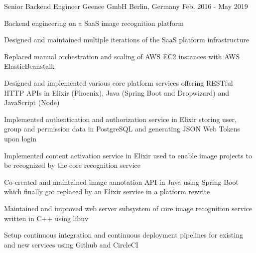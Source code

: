\begin{cventries}
  \cventry
    {Senior Backend Engineer} %
    {Geenee GmbH} %
    {Berlin, Germany} %
    {Feb. 2016 - May 2019} %
    {
      \begin{cvitems} %
        \item {Backend engineering on a SaaS image recognition platform}
        \begin{cvsubitems}
          \item {Designed and maintained multiple iterations of the SaaS platform infrastructure}
          \item {Replaced manual orchestration and scaling of AWS EC2 instances with AWS ElasticBeanstalk}
        \end{cvsubitems}
        \item {Designed and implemented various core platform services offering RESTful HTTP APIs in Elixir (Phoenix), Java (Spring Boot and Dropwizard) and JavaScript (Node)}
        \begin{cvsubitems}
          \item {Implemented authentication and authorization service in Elixir storing user, group and permission data in PostgreSQL and generating JSON Web Tokens upon login}
          \item {Implemented content activation service in Elixir used to enable image projects to be recognized by the core recognition service}
          \item {Co-created and maintained image annotation API in Java using Spring Boot which finally got replaced by an Elixir service in a platform rewrite}
        \end{cvsubitems}
        \item {Maintained and improved web server subsystem of core image recognition service written in C++ using libuv}
        \item {Setup continuous integration and continuous deployment pipelines for existing and new services using Github and CircleCI}
      \end{cvitems}
    }


\end{cventries}
